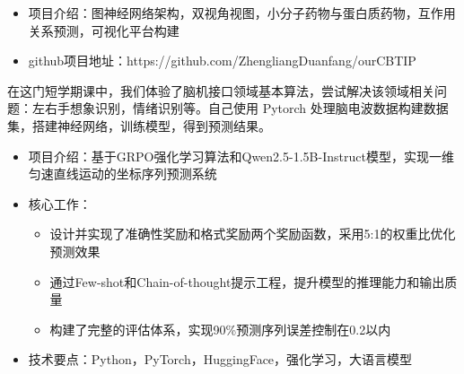 \begin{itemize}
    \item 项目介绍：图神经网络架构，双视角视图，小分子药物与蛋白质药物，互作用关系预测，可视化平台构建
    \item github项目地址：https://github.com/ZhengliangDuanfang/ourCBTIP
\end{itemize}

在这门短学期课中，我们体验了脑机接口领域基本算法，尝试解决该领域相关问题：左右手想象识别，情绪识别等。自己使用 Pytorch 处理脑电波数据构建数据集，搭建神经网络，训练模型，得到预测结果。

\begin{itemize}
    \item 项目介绍：基于GRPO强化学习算法和Qwen2.5-1.5B-Instruct模型，实现一维匀速直线运动的坐标序列预测系统
    \item 核心工作：
        \begin{itemize}
            \item 设计并实现了准确性奖励和格式奖励两个奖励函数，采用5:1的权重比优化预测效果
            \item 通过Few-shot和Chain-of-thought提示工程，提升模型的推理能力和输出质量
            \item 构建了完整的评估体系，实现90\%预测序列误差控制在0.2以内
        \end{itemize}
    \item 技术要点：Python，PyTorch，HuggingFace，强化学习，大语言模型
\end{itemize}


